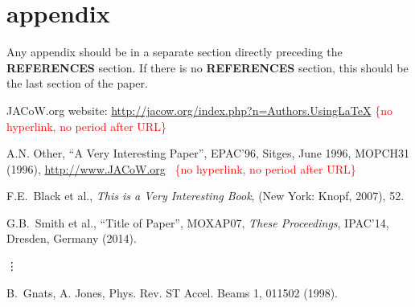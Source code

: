 \documentclass[acus,%
              ]{jacow}
\newcommand\SEC[1]{\textbf{\uppercase{#1}}}
\begin{document}
\section{appendix}
Any appendix should be in a separate section directly preceding
the \SEC{References} section. If there is no \SEC{References} section,
this should be the last section of the paper.

\iffalse  %
	\newpage
	\printbibliography

\else

\begin{thebibliography}{99} %


	JACoW.org website:
	\url{http://jacow.org/index.php?n=Authors.UsingLaTeX}%
	\hfill\textcolor{red}{\{no hyperlink, no period after URL\}}

	A.N. Other,
	``A Very Interesting Paper'',
	EPAC'96, Sitges, June 1996, MOPCH31 (1996),
	\url{http://www.JACoW.org}\newline \mbox{ } \hfill\textcolor{red}{\{no hyperlink, no period after URL\}}

	F.E.~Black et al.,
	\textit{This is a Very Interesting Book},
	(New York: Knopf, 2007), 52.

    G.B.~Smith et al., ``Title of Paper'',
    MOXAP07, \textit{These Proceedings}, IPAC'14, Dresden, Germany (2014).

	\hspace*{-1.1em}\mbox{\vdots}

\addtocounter{enumi}{5}
	B.~Gnats, A. Jones,
	Phys. Rev. ST Accel. Beams 1, 011502 (1998).

\end{thebibliography}

\fi
\end{document}
